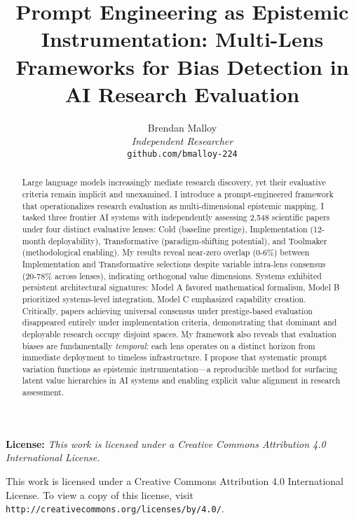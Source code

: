 \documentclass{article}
\begin{document}
\title{Prompt Engineering as Epistemic Instrumentation: Multi-Lens Frameworks for Bias Detection in AI Research Evaluation}

\author{Brendan Malloy\\
\textit{Independent Researcher}\\
\texttt{github.com/bmalloy-224}}

\maketitle

\begin{abstract}
Large language models increasingly mediate research discovery, yet their evaluative criteria remain implicit and unexamined. I introduce a prompt-engineered framework that operationalizes research evaluation as multi-dimensional epistemic mapping. I tasked three frontier AI systems with independently assessing 2,548 scientific papers under four distinct evaluative lenses: Cold (baseline prestige), Implementation (12-month deployability), Transformative (paradigm-shifting potential), and Toolmaker (methodological enabling). My results reveal near-zero overlap (0-6\%) between Implementation and Transformative selections despite variable intra-lens consensus (20-78\% across lenses), indicating orthogonal value dimensions. Systems exhibited persistent architectural signatures: Model A favored mathematical formalism, Model B prioritized systems-level integration, Model C emphasized capability creation. Critically, papers achieving universal consensus under prestige-based evaluation disappeared entirely under implementation criteria, demonstrating that dominant and deployable research occupy disjoint spaces. My framework also reveals that evaluation biases are fundamentally \textit{temporal}: each lens operates on a distinct horizon from immediate deployment to timeless infrastructure. I propose that systematic prompt variation functions as epistemic instrumentation—a reproducible method for surfacing latent value hierarchies in AI systems and enabling explicit value alignment in research assessment.
\end{abstract}

\textbf{License:} \textit{This work is licensed under a Creative Commons Attribution 4.0 International License.}

\begin{center}
\small
This work is licensed under a Creative Commons Attribution 4.0 International License. 
To view a copy of this license, visit \texttt{http://creativecommons.org/licenses/by/4.0/}.
\end{center}
\end{document}
